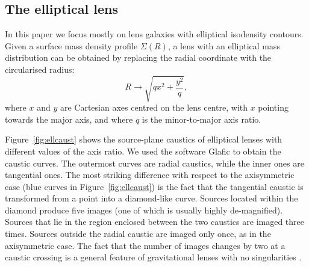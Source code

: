 \documentclass{aa}
\def\Fref#1{Figure~\ref{#1}\xspace}
\begin{document}
\subsection{The elliptical lens}

In this paper we focus mostly on lens galaxies with elliptical isodensity contours.
Given a surface mass density profile $\Sigma(R)$, a lens with an elliptical mass distribution can be obtained by replacing the radial coordinate with the circularised radius:
\begin{equation}\label{eq:elltransf}
R \rightarrow \sqrt{qx^2 + \frac{y^2}{q}},
\end{equation}
where $x$ and $y$ are Cartesian axes centred on the lens centre, with $x$ pointing towards the major axis, and where $q$ is the minor-to-major axis ratio.

\Fref{fig:ellcaust} shows the source-plane caustics of elliptical lenses with different values of the axis ratio. We used the software {\sc Glafic} \citep{Ogu21} to obtain the caustic curves.
The outermost curves are radial caustics, while the inner ones are tangential ones.
The most striking difference with respect to the axisymmetric case (blue curves in \Fref{fig:ellcaust}) is the fact that the tangential caustic is transformed from a point into a diamond-like curve.
Sources located within the diamond produce five images (one of which is usually highly de-magnified). Sources that lie in the region enclosed between the two caustics are imaged three times. Sources outside the radial caustic are imaged only once, as in the axisymmetric case.
The fact that the number of images changes by two at a caustic crossing is a general feature of gravitational lenses with no singularities \citep{SEF92}.
\end{document}
